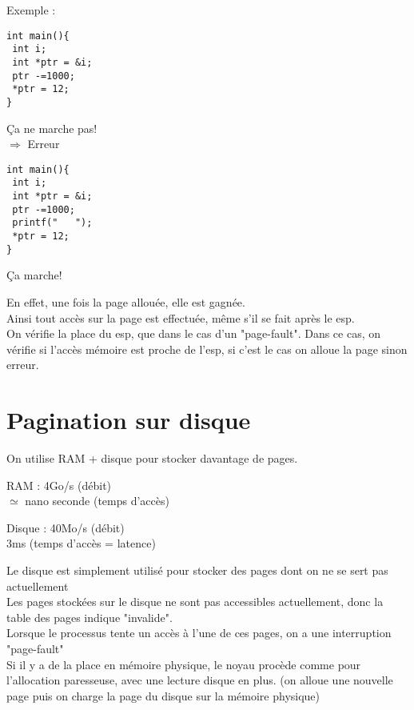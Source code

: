 \documentclass[12pt,a4paper]{report}
\begin{document}
Exemple : \\
\begin{minipage}{0.5\linewidth}
\begin{verbatim}
int main(){
 int i;
 int *ptr = &i;
 ptr -=1000;
 *ptr = 12;
}
\end{verbatim}
Ça ne marche pas!\\
$\Rightarrow$ Erreur
\end{minipage}
\begin{minipage}{0.5\linewidth}
\begin{verbatim}
int main(){
 int i;
 int *ptr = &i;
 ptr -=1000;
 printf("   ");
 *ptr = 12;
}
\end{verbatim}
Ça marche!
\end{minipage}

\bigskip
En effet, une fois la page allouée, elle est gagnée.\\
Ainsi tout accès sur la page est effectuée, même s'il se fait après le esp.\\ On vérifie la place du esp, que dans le cas d'un "page-fault". Dans ce cas, on vérifie si l’accès mémoire est proche de l'esp, si c'est le cas on alloue la page sinon erreur.\\

\chapter{Pagination sur disque}
On utilise RAM + disque pour stocker davantage de pages.\\

\begin{minipage}{0.5\linewidth}
RAM : 4Go/s (débit) \\
\hspace{2cm}$\simeq$ nano seconde (temps d'accès)\\
\end{minipage}
\begin{minipage}{0.5\linewidth}
Disque : 40Mo/s (débit) \\
\hspace{2cm} 3ms (temps d'accès = latence)\\
\end{minipage}

Le disque est simplement utilisé pour stocker des pages dont on ne se sert pas actuellement\\
Les pages stockées sur le disque ne sont pas accessibles actuellement, donc la table des pages indique "invalide".\\
Lorsque le processus tente un accès à l'une de ces pages, on a une interruption  "page-fault" \\
Si il y a de la place en mémoire physique, le noyau procède comme pour l'allocation paresseuse, avec une lecture disque en plus. (on alloue une nouvelle page puis on charge la page du disque sur la mémoire physique)\\
\end{document}
